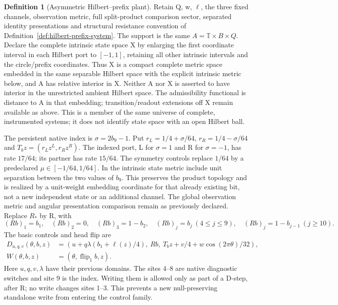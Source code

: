 \documentclass[11pt,a4paper]{article}
\theoremstyle{definition}
\newtheorem{definition}[theorem]{Definition}
\begin{document}
\begin{definition}[Asymmetric Hilbert--prefix plant]\label{def:asymmetric-native-plant}
Retain Q, w, $\ell$, the three fixed channels, observation metric, full split-product
comparison sector, separated identity presentations and structural resistance
convention of Definition~\ref{def:hilbert-prefix-system}. The support is the
same $A=\mathbb T\times B\times Q$. Declare the complete intrinsic state space
X by enlarging the first coordinate interval in each Hilbert port to $[-1,1]$, retaining
all other intrinsic intervals and the circle/prefix coordinates. Thus X is
a compact complete metric space embedded in the same separable Hilbert space
with the explicit intrinsic metric below, and A has
relative interior in X. Neither A nor X is asserted to have interior in the
unrestricted ambient Hilbert space. The admissibility functional is distance
to A in that embedding; transition/readout extensions off X remain available
as above. This is a member of the same universe of complete, instrumented
systems; it does not identify state space with an open Hilbert ball.

The persistent native index is $\sigma=2b_9-1$. Put
$r_L=1/4+\sigma/64$, $r_R=1/4-\sigma/64$ and
$T_bz=(r_Lz^L,r_Rz^R)$. The indexed port, L for $\sigma=1$ and R for
$\sigma=-1$, has rate $17/64$; its partner has rate $15/64$.
The symmetry controls replace $1/64$ by a predeclared
$\mu\in[-1/64,1/64]$. In the intrinsic state metric include unit separation
between the two values of $b_9$. This preserves the product topology and is
realized by a unit-weight embedding coordinate for that already existing bit,
not a new independent state or an additional channel. The global observation
metric and angular presentation comparison remain as previously declared.
Replace $R_*$ by R, with
\[
 (Rb)_1=b_1,\quad (Rb)_2=0,\quad (Rb)_3=1-b_2,
 \quad (Rb)_j=b_j\ (4\le j\le9),\quad
 (Rb)_j=1-b_{j-1}\ (j\ge10).
\]
The basic controls and head flip are
\[
 \begin{aligned}
 D_{u,q,v}(\theta,b,z)&=
 (u+q\lambda(b_1+\ell(z)/4),\ Rb,\ T_bz+v/4+w\cos(2\pi\theta)/32),\\
 W(\theta,b,z)&=(\theta,\operatorname{flip}_1b,z).
 \end{aligned}
\]
Here $u,q,v,\lambda$ have their previous domains. The sites 4--8 are native
diagnostic switches and site 9 is the index. Writing them is allowed only as part of a D-step,
after R; no write changes sites 1--3. This prevents a new null-preserving
standalone write from entering the control family.


\end{definition}
\end{document}
